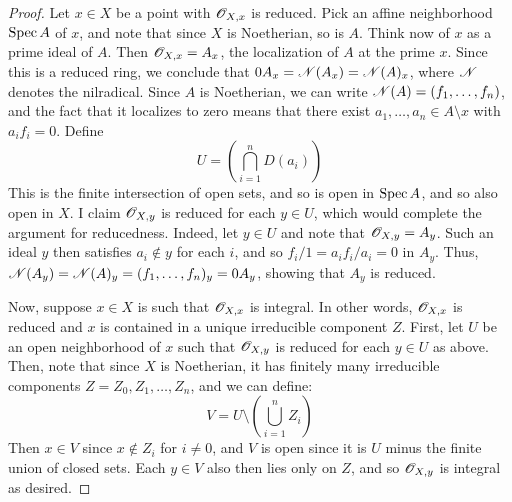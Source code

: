 \begin{proof}
	Let $x \in X$ be a point with $\mathscr{O}_{X,x}$ is reduced. Pick an affine neighborhood $\operatorname{Spec} A$ of $x$, and note that since $X$ is Noetherian, so is $A$. Think now of $x$ as a prime ideal of $A$. Then $\mathscr{O}_{X,x} = A_x$, the localization of $A$ at the prime $x$. Since this is a reduced ring, we conclude that $0A_x = \mathscr{N}(A_x) = \mathscr{N}(A)_x$, where $\mathscr{N}$ denotes the nilradical. Since $A$ is Noetherian, we can write $\mathscr{N}(A) = (f_1,\ldots,f_n)$, and the fact that it localizes to zero means that there exist $a_1,\ldots,a_n \in A \setminus x$ with $a_if_i = 0$. Define
	\[ U = \left(\bigcap_{i=1}^n D(a_i)\right) \]
	This is the finite intersection of open sets, and so is open in $\operatorname{Spec} A$, and so also open in $X$. I claim $\mathscr{O}_{X,y}$ is reduced for each $y \in U$, which would complete the argument for reducedness. Indeed, let $y \in U$ and note that $\mathscr{O}_{X,y} = A_y$. Such an ideal $y$ then satisfies $a_i \notin y$ for each $i$, and so $f_i/1 = a_if_i/a_i = 0$ in $A_y$. Thus, $\mathscr{N}(A_y) = \mathscr{N}(A)_y = (f_1,\ldots,f_n)_y = 0A_y$, showing that $A_y$ is reduced.
	
	Now, suppose $x \in X$ is such that $\mathscr{O}_{X,x}$ is integral. In other words, $\mathscr{O}_{X,x}$ is reduced and $x$ is contained in a unique irreducible component $Z$. First, let $U$ be an open neighborhood of $x$ such that $\mathscr{O}_{X,y}$ is reduced for each $y \in U$ as above. Then, note that since $X$ is Noetherian, it has finitely many irreducible components $Z = Z_0,Z_1,\ldots,Z_n$, and we can define:
	\[ V = U \setminus \left(\bigcup_{i=1}^n Z_i\right) \]
	Then $x \in V$ since $x \notin Z_i$ for $i \neq 0$, and $V$ is open since it is $U$ minus the finite union of closed sets. Each $y \in V$ also then lies only on $Z$, and so $\mathscr{O}_{X,y}$ is integral as desired.
\end{proof}
